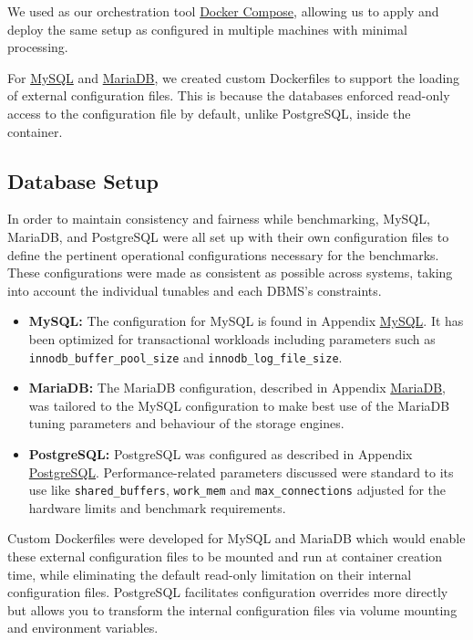 We used as our orchestration tool \hyperref[sec:docker-compose]{Docker Compose}, allowing us to apply and deploy the same setup as configured in multiple machines with minimal processing.

For \hyperref[sec:dockerfile-mysql]{MySQL} and \hyperref[sec:dockerfile-mariadb]{MariaDB}, we created custom Dockerfiles to support the loading of external configuration files. This is because the databases enforced read-only access to the configuration file by default, unlike PostgreSQL, inside the container.

\subsection{Database Setup}
\label{sec:database-setup}

In order to maintain consistency and fairness while benchmarking, MySQL, MariaDB, and PostgreSQL were all set up with their own configuration files to define the pertinent operational configurations necessary for the benchmarks. These configurations were made as consistent as possible across systems, taking into account the individual tunables and each DBMS's constraints.

\begin{itemize}
    \setlength\itemsep{0.1em}
    \item \textbf{MySQL:} The configuration for MySQL is found in Appendix \hyperref[sec:mysql-config]{MySQL}. It has been optimized for transactional workloads including parameters such as \texttt{innodb\_buffer\_pool\_size} and \texttt{innodb\_log\_file\_size}.
    \item \textbf{MariaDB:} The MariaDB configuration, described in Appendix \hyperref[sec:mariadb-config]{MariaDB}, was tailored to the MySQL configuration to make best use of the MariaDB tuning parameters and behaviour of the storage engines.
    \item \textbf{PostgreSQL:} PostgreSQL was configured as described in Appendix \hyperref[sec:postgresql-config]{PostgreSQL}. Performance-related parameters discussed were standard to its use like \texttt{shared\_buffers}, \texttt{work\_mem} and \texttt{max\_connections} adjusted for the hardware limits and benchmark requirements.
\end{itemize}

Custom Dockerfiles were developed for MySQL and MariaDB which would enable these external configuration files to be mounted and run at container creation time, while eliminating the default read-only limitation on their internal configuration files. PostgreSQL facilitates configuration overrides more directly but allows you to transform the internal configuration files via volume mounting and environment variables. 

